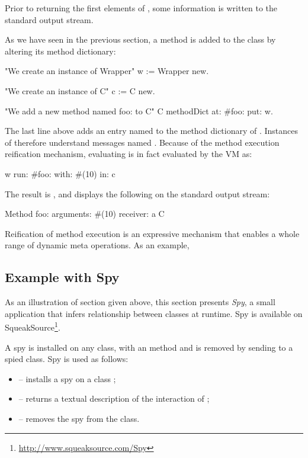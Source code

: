 \documentclass[a4paper,10pt,twoside]{book}
\begin{document}
Prior to returning the first elements of , some information is written to the standard output stream.

As we have seen in the previous section, a method  is added to the class  by altering its method dictionary:

\begin{code}{}
"We create an instance of Wrapper"
w := Wrapper new.

"We create an instance of C"
c := C new.

"We add a new method named foo: to C"
C methodDict at: #foo: put: w.
\end{code}

The last line above adds an entry named  to the method dictionary of . Instances of  therefore understand messages named . Because of the method execution reification mechanism, evaluating  is in fact evaluated by the VM as:

\begin{code}{}
w run: #foo: with: #(10) in: c
\end{code}

The result is , and displays the following on the standard output stream:

\begin{code}{}
Method foo: arguments: #(10) receiver: a C
\end{code}

Reification of method execution is an expressive mechanism that enables a whole range of dynamic meta operations. As an example, 

\subsection{Example with Spy}

As an illustration of section given above, this section presents \emph{Spy}, a small application that infers relationship between classes at runtime. Spy is available on SqueakSource\footnote{\url{http://www.squeaksource.com/Spy}}. 

A spy is installed on any class, with an  method and is removed by sending  to a spied class. Spy is used as follows: 
\begin{itemize}
\item {} -- installs a spy on a class ;
\item {} -- returns a textual description of the interaction of ;
\item {} -- removes the spy from the class.
\end{itemize}
\end{document}
